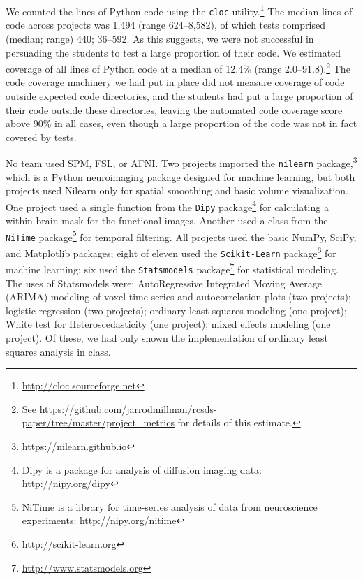 We counted the lines of Python code using the \texttt{cloc}
utility.\footnote{\url{http://cloc.sourceforge.net}}  The median lines of code
across projects was 1,494 (range 624--8,582), of which tests comprised
(median; range) 440; 36--592.  As this suggests, we were not successful in
persuading the students to test a large proportion of their code.  We
estimated coverage of all lines of Python code at a median of 12.4\% (range
2.0--91.8).\footnote{See
\url{https://github.com/jarrodmillman/rcsds-paper/tree/master/project_metrics}
for details of this estimate.}  The code coverage machinery we had put in
place did not measure coverage of code outside expected code directories, and
the students had put a large proportion of their code outside these
directories, leaving the automated code coverage score above 90\% in all
cases, even though a large proportion of the code was not in fact covered by
tests.

No team used SPM, FSL, or AFNI.  Two projects imported the
\texttt{nilearn} package,\footnote{\url{https://nilearn.github.io}} which is a
Python neuroimaging package designed for machine learning, but both projects
used Nilearn only for spatial smoothing and basic volume visualization.  One
project used a single function from the
\texttt{Dipy} package\footnote{Dipy is a package for analysis of diffusion
imaging data: \url{http://nipy.org/dipy}} for calculating a
within-brain mask for the functional images.  Another used a class from the
\texttt{NiTime} package\footnote{NiTime is a library for time-series analysis
of data from neuroscience experiments: \url{http://nipy.org/nitime}} for
temporal filtering.  All projects used the basic NumPy, SciPy, and Matplotlib
packages; eight of eleven used the \texttt{Scikit-Learn}
package\footnote{\url{http://scikit-learn.org}} for machine learning; six used
the \texttt{Statsmodels} package\footnote{\url{http://www.statsmodels.org}}
for statistical modeling.  The uses of Statsmodels were: AutoRegressive
Integrated Moving Average (ARIMA) modeling of voxel time-series and
autocorrelation plots (two projects); logistic regression (two projects);
ordinary least squares modeling (one project); White test for
Heteroscedasticity (one project); mixed effects modeling (one project).  Of
these, we had only shown the implementation of ordinary least squares analysis
in class.

